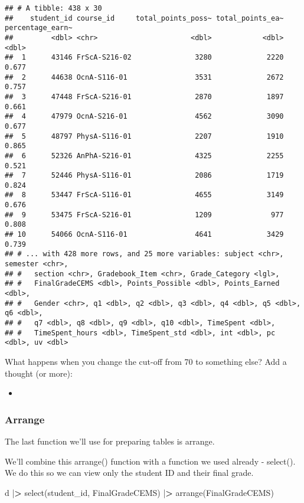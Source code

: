 \documentclass[
]{article}
\newenvironment{Shaded}{\begin{snugshade}}{\end{snugshade}}
\newcommand{\ErrorTok}[1]{\textcolor[rgb]{0.64,0.00,0.00}{\textbf{#1}}}
\newcommand{\FunctionTok}[1]{\textcolor[rgb]{0.00,0.00,0.00}{#1}}
\newcommand{\NormalTok}[1]{#1}
\newcommand{\SpecialCharTok}[1]{\textcolor[rgb]{0.00,0.00,0.00}{#1}}
\providecommand{\tightlist}{%
  \setlength{\itemsep}{0pt}\setlength{\parskip}{0pt}}
\begin{document}
\begin{verbatim}
## # A tibble: 438 x 30
##    student_id course_id     total_points_poss~ total_points_ea~ percentage_earn~
##         <dbl> <chr>                      <dbl>            <dbl>            <dbl>
##  1      43146 FrScA-S216-02               3280             2220            0.677
##  2      44638 OcnA-S116-01                3531             2672            0.757
##  3      47448 FrScA-S216-01               2870             1897            0.661
##  4      47979 OcnA-S216-01                4562             3090            0.677
##  5      48797 PhysA-S116-01               2207             1910            0.865
##  6      52326 AnPhA-S216-01               4325             2255            0.521
##  7      52446 PhysA-S116-01               2086             1719            0.824
##  8      53447 FrScA-S116-01               4655             3149            0.676
##  9      53475 FrScA-S216-01               1209              977            0.808
## 10      54066 OcnA-S116-01                4641             3429            0.739
## # ... with 428 more rows, and 25 more variables: subject <chr>, semester <chr>,
## #   section <chr>, Gradebook_Item <chr>, Grade_Category <lgl>,
## #   FinalGradeCEMS <dbl>, Points_Possible <dbl>, Points_Earned <dbl>,
## #   Gender <chr>, q1 <dbl>, q2 <dbl>, q3 <dbl>, q4 <dbl>, q5 <dbl>, q6 <dbl>,
## #   q7 <dbl>, q8 <dbl>, q9 <dbl>, q10 <dbl>, TimeSpent <dbl>,
## #   TimeSpent_hours <dbl>, TimeSpent_std <dbl>, int <dbl>, pc <dbl>, uv <dbl>
\end{verbatim}

What happens when you change the cut-off from 70 to something else? Add
a thought (or more):

\begin{itemize}
\tightlist
\item
\end{itemize}

\hypertarget{arrange}{%
\subsubsection{Arrange}\label{arrange}}

The last function we'll use for preparing tables is arrange.

We'll combine this arrange() function with a function we used already -
select(). We do this so we can view only the student ID and their final
grade.

\begin{Shaded}
\begin{Highlighting}[]
\NormalTok{d }\SpecialCharTok{|}\ErrorTok{\textgreater{}} 
  \FunctionTok{select}\NormalTok{(student\_id, FinalGradeCEMS) }\SpecialCharTok{|}\ErrorTok{\textgreater{}} 
  \FunctionTok{arrange}\NormalTok{(FinalGradeCEMS)}
\end{Highlighting}
\end{Shaded}
\end{document}
